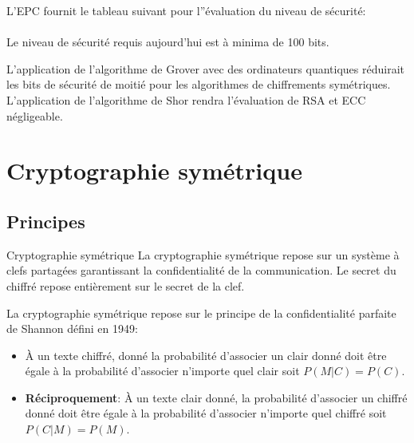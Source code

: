 \begin{Pre}
L'\gls{EPC} fournit le tableau suivant pour l''évaluation du niveau de sécurité:\\
\EPCarraysecuritybits\\
Le niveau de sécurité requis aujourd'hui est à minima de 100 bits.
\end{Pre}
\begin{Stop}
L'application de l'algorithme de Grover avec des ordinateurs quantiques réduirait les bits de sécurité de moitié pour les algorithmes de chiffrements symétriques. L'application de l'algorithme de Shor rendra l'évaluation de RSA et ECC négligeable.
\end{Stop}
\section{Cryptographie symétrique}
\subsection{Principes}
\begin{Define}{Cryptographie symétrique}
La cryptographie symétrique repose sur un système à clefs partagées garantissant la confidentialité de la communication. Le secret du chiffré repose entièrement sur le secret de la clef.
\end{Define}
La cryptographie symétrique repose sur le principe de la confidentialité parfaite de Shannon défini en 1949:\begin{itemize}
\item \`A un texte chiffré, donné la probabilité d'associer un clair donné doit être égale à la probabilité d'associer n'importe quel clair soit $P(M|C) = P(C)$.
\item \textbf{Réciproquement}: \`A un texte clair donné, la probabilité d'associer un chiffré donné doit être égale à la probabilité d'associer n'importe quel chiffré soit $P(C|M) = P(M)$.
\end{itemize}

